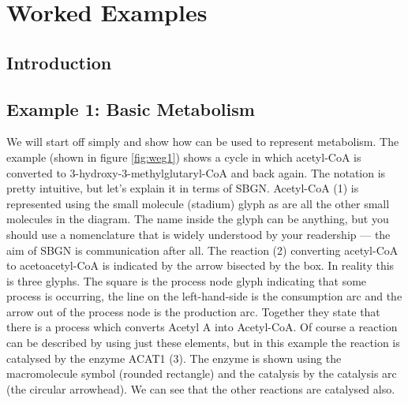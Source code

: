 \chapter{Worked Examples}
\label{chp:worked-egs}

\section{Introduction}

\section{Example 1: Basic Metabolism}

We will start off simply and show how \PD can be used to represent
metabolism. The example (shown in figure \ref{fig:weg1}) shows a cycle
in which acetyl-CoA is converted to 3-hydroxy-3-methylglutaryl-CoA and
back again. The notation is pretty intuitive, but let's explain it in
terms of SBGN. Acetyl-CoA (1) is represented using the small molecule
(stadium) glyph as are all the other small molecules in the
diagram. The name inside the glyph can be anything, but you should use
a nomenclature that is widely understood by your readership --- the
aim of SBGN is communication after all. The reaction (2) converting
acetyl-CoA to acetoacetyl-CoA is indicated by the arrow bisected by
the box. In reality this is three glyphs. The square is the process
node glyph indicating that some process is occurring, the line on the
left-hand-side is the consumption arc and the arrow out of the process
node is the production arc. Together they state that there is a
process which converts Acetyl A into Acetyl-CoA. Of course a reaction
can be described by using just these elements, but in this example the
reaction is catalysed by the enzyme ACAT1 (3). The enzyme is shown
using the macromolecule symbol (rounded rectangle) and the catalysis
by the catalysis arc (the circular arrowhead). We can see that the
other reactions are catalysed also.

